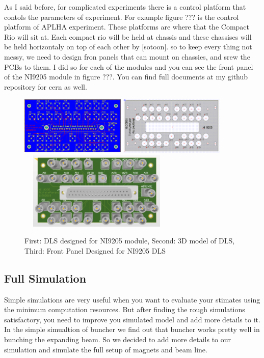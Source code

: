 \documentclass[12pt,a4paper]{article}
\begin{document}
As I said before, for complicated experiments there is a control platform that contols the parameters of experiment. For example figure ??? is the control platform of APLHA experiment.
These platforms are where that the Compact Rio will sit at. Each compact rio will be held at chassis and these chassises will be held horizontaly on top of each other by [sotoon]. so to keep every thing not messy, we need to design fron panels that can mount on chassies, and srew the PCBs to them. I did so for each of the modules and you can see the front panel of the NI9205 module in figure ???. You can find full documents at my github repository for cern as well.


\begin{figure}[h]
\centering
\includegraphics[width=50mm, height=28mm]{ni9205_pcb}
\includegraphics[width=50mm,
height=28mm]{ni9205panel}
\includegraphics[width=75mm,
height=37mm]{ni9205_3d}
\caption{First: DLS designed for NI9205 module, Second: 3D model of DLS, Third: Front Panel Designed for NI9205 DLS}
\label{NI}
\end{figure}


\subsection{Full Simulation}
‌Simple simulations are very useful when you want to evaluate your stimates using the minimum computation resources. But after finding the rough simulations satisfactory, you need to improve you simulated model and add more details to it. In the simple simualtion of buncher we find out that buncher works pretty well in bunching the expanding beam. So we decided to add more details to our simulation and simulate the full setup of magnets and beam line.
\end{document}
